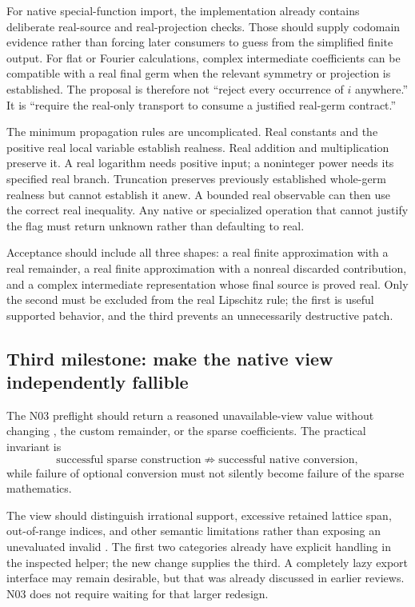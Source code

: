 \documentclass[11pt,a4paper]{article}
\newcommand{\code}[1]{\texttt{\detokenize{#1}}}
\begin{document}
For native special-function import, the implementation already contains deliberate real-source and real-projection checks. Those should supply codomain evidence rather than forcing later consumers to guess from the simplified finite output. For flat or Fourier calculations, complex intermediate coefficients can be compatible with a real final germ when the relevant symmetry or projection is established. The proposal is therefore not ``reject every occurrence of \(i\) anywhere.'' It is ``require the real-only transport to consume a justified real-germ contract.''\cite{repo-native,repo-fourier}

The minimum propagation rules are uncomplicated. Real constants and the positive real local variable establish realness. Real addition and multiplication preserve it. A real logarithm needs positive input; a noninteger power needs its specified real branch. Truncation preserves previously established whole-germ realness but cannot establish it anew. A bounded real observable can then use the correct real inequality. Any native or specialized operation that cannot justify the flag must return unknown rather than defaulting to real.

Acceptance should include all three shapes: a real finite approximation with a real remainder, a real finite approximation with a nonreal discarded contribution, and a complex intermediate representation whose final source is proved real. Only the second must be excluded from the real Lipschitz rule; the first is useful supported behavior, and the third prevents an unnecessarily destructive patch.

\subsection{Third milestone: make the native view independently fallible}
The N03 preflight should return a reasoned unavailable-view value without changing \code{Normal[s]}, the custom remainder, or the sparse coefficients. The practical invariant is
\[
 \text{successful sparse construction}
 \not\Rightarrow \text{successful native conversion},
\]
while failure of optional conversion must not silently become failure of the sparse mathematics.

The view should distinguish irrational support, excessive retained lattice span, out-of-range indices, and other semantic limitations rather than exposing an unevaluated invalid \code{SeriesData}. The first two categories already have explicit handling in the inspected helper; the new change supplies the third. A completely lazy export interface may remain desirable, but that was already discussed in earlier reviews. N03 does not require waiting for that larger redesign.\cite{repo-main,review7,review8}
\end{document}
